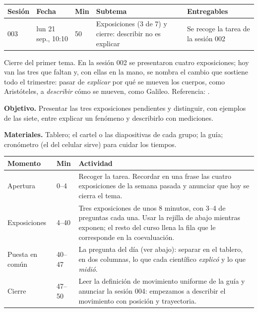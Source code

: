\documentclass[11pt]{article}
\begin{document}
\encabezado*

\begin{center}
{\renewcommand{\arraystretch}{1.3}
\begin{tabularx}{\linewidth}{@{}l l l X l@{}}
  \toprule
  \textbf{Sesión} & \textbf{Fecha} & \textbf{Min} & \textbf{Subtema} & \textbf{Entregables}\\
  \midrule
  003 & lun 21 sep., 10:10 & 50 & Exposiciones (3 de 7) y cierre: describir no es explicar
      & Se recoge la tarea de la sesión 002\\
  \bottomrule
\end{tabularx}}
\end{center}

Cierre del primer tema. En la sesión 002 se presentaron cuatro exposiciones; hoy van las tres
que faltan y, con ellas en la mano, se nombra el cambio que sostiene todo el trimestre: pasar
de \emph{explicar} por qué se mueven los cuerpos, como Aristóteles, a \emph{describir} cómo se
mueven, como Galileo. Referencia: .


\textbf{Objetivo.} Presentar las tres exposiciones pendientes y distinguir, con ejemplos de
las siete, entre explicar un fenómeno y describirlo con mediciones.

\textbf{Materiales.} Tablero; el cartel o las diapositivas de cada grupo; la guía; cronómetro
(el del celular sirve) para cuidar los tiempos.

\begin{center}
{\renewcommand{\arraystretch}{1.3}
\begin{tabularx}{\linewidth}{@{}l l X@{}}
  \toprule
  \textbf{Momento} & \textbf{Min} & \textbf{Actividad}\\
  \midrule
  Apertura & 0--4 & Recoger la tarea. Recordar en una frase las cuatro exposiciones de la
    semana pasada y anunciar que hoy se cierra el tema.\\
  Exposiciones & 4--40 & Tres exposiciones de unos 8 minutos, con 3--4 de preguntas cada
    una. Usar la rejilla de abajo mientras exponen; el resto del curso llena la fila que le
    corresponde en la coevaluación.\\
  Puesta en común & 40--47 & La pregunta del día (ver abajo): separar en el tablero, en dos
    columnas, lo que cada científico \emph{explicó} y lo que \emph{midió}.\\
  Cierre & 47--50 & Leer la definición de movimiento uniforme de la guía y anunciar la
    sesión 004: empezamos a describir el movimiento con posición y trayectoria.\\
  \bottomrule
\end{tabularx}}
\end{center}
\end{document}
